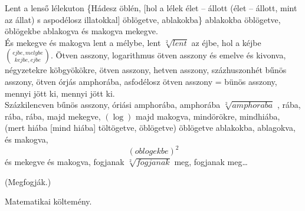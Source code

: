 \documentclass  [12pt]{article}
\begin{document}
Lent a lenső lélekuton \{Hádesz öblén, [hol a lélek élet – állott (élet – állott, mint az állat) s aspodélosz illatokkal] öblögetve, ablakokba\} ablakokba öblögetve, öblögekbe ablakogva és makogva mekegve.\\
És mekegve és makogva lent a mélybe, lent $ \sqrt[2]{lent}  $ az éjbe, hol a kéjbe $ {ejbe,melybe \choose   kejbe,ejbe} $.
Ötven asszony, logarithmus ötven asszony és emelve és kivonva, négyzetekre köbgyökökre, ötven asszony, hetven asszony, százhuszonhét bűnös asszony, ötven órjás amphorába, asfodélosz ötven asszony = bünös asszony, mennyi jött ki, mennyi jött ki.\\
Százkilencven bűnös asszony, óriási amphorába, amphorába \begin{math} \sqrt[2]{amphoraba} \end{math} , rába, rába, rába, majd mekegve, $(\log) $ majd makogva, mindörökre, mindhiába, (mert hiába [mind hiába] töltögetve, öblögetve) öblögetve ablakokba, ablagokva, és makogva,\begin{displaymath} (oblogekbe)^{2} \end{displaymath} és mekegve és makogva, fogjanak $ \sqrt[2]{fogjanak} $ meg, fogjanak meg…\\

\begin{center}
(Megfogják.)
\end{center}

\tiny *Matematikai költemény.
\end{document}
